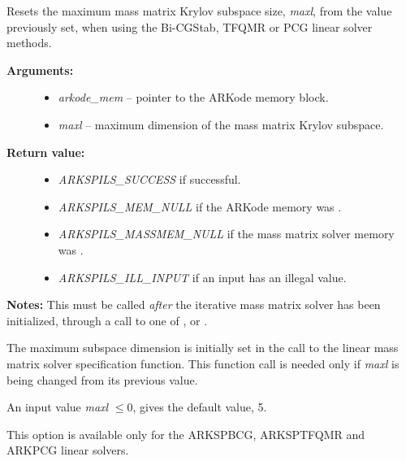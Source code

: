 \documentclass[letterpaper,10pt,english]{sphinxmanual}
\begin{document}

\begin{fulllineitems}
\label{c_interface/User_callable:c.ARKSpilsSetMassMaxl}
Resets the maximum mass matrix Krylov subspace size, \emph{maxl}, from
the value previously set, when using the Bi-CGStab, TFQMR or PCG linear
solver methods.
\begin{description}
\item[{\textbf{Arguments:}}] \leavevmode\begin{itemize}
\item {} 
\emph{arkode\_mem} -- pointer to the ARKode memory block.

\item {} 
\emph{maxl} -- maximum dimension of the mass matrix Krylov subspace.

\end{itemize}

\item[{\textbf{Return value:}}] \leavevmode\begin{itemize}
\item {} 
\emph{ARKSPILS\_SUCCESS} if successful.

\item {} 
\emph{ARKSPILS\_MEM\_NULL} if the ARKode memory was .

\item {} 
\emph{ARKSPILS\_MASSMEM\_NULL} if the mass matrix solver memory was .

\item {} 
\emph{ARKSPILS\_ILL\_INPUT} if an input has an illegal value.

\end{itemize}

\end{description}

\textbf{Notes:} This must be called \emph{after} the iterative mass matrix
solver has been initialized, through a call to one of
{\hyperref[c_interface/User_callable:c.ARKMassSpbcg]{\emph{}}}, {\hyperref[c_interface/User_callable:c.ARKMassSptfqmr]{\emph{}}} or
{\hyperref[c_interface/User_callable:c.ARKMassPcg]{\emph{}}}.

The maximum subspace dimension is initially set in the
call to the linear mass matrix solver specification function.  This
function call is needed only if \emph{maxl} is being changed from its
previous value.

An input value \emph{maxl} \(\le 0\), gives the default value, 5.

This option is available only for the ARKSPBCG, ARKSPTFQMR and
ARKPCG linear solvers.

\end{fulllineitems}
\end{document}
